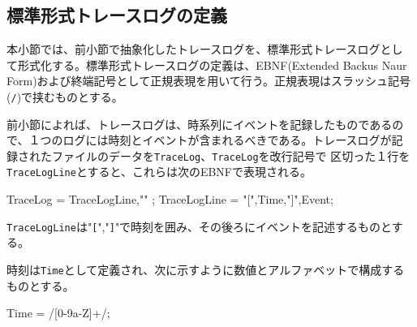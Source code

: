 
\subsection{標準形式トレースログの定義}

本小節では、前小節で抽象化したトレースログを、標準形式トレースログとし
て形式化する。標準形式トレースログの定義は、EBNF(Extended Backus Naur
Form)および終端記号として正規表現を用いて行う。正規表現はスラッシュ記号
({\tt /})で挟むものとする。

前小節によれば、トレースログは、時系列にイベントを記録したものであるの
で、１つのログには時刻とイベントが含まれるべきである。トレースログが記
録されたファイルのデータを\verb|TraceLog|、\verb|TraceLog|を改行記号で
区切った１行を\verb|TraceLogLine|とすると、これらは次のEBNFで表現される。

\begin{EBNF}
TraceLog = { TraceLogLine,"\n" };
TraceLogLine = "[",Time,"]",Event;
\end{EBNF}

\verb|TraceLogLine|は"\verb|[|","\verb|]|"で時刻を囲み、その後ろにイベントを記述するものとする。

時刻は\verb|Time|として定義され、次に示すように数値とアルファベットで構成するものとする。

\begin{EBNF}
Time = /[0-9a-Z]+/;
\end{EBNF}

